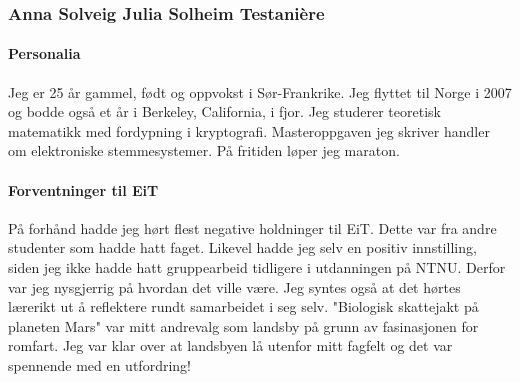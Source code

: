 \subsubsection{Anna Solveig Julia Solheim Testani\`{e}re}

\paragraph{Personalia}
Jeg er 25 år gammel, født og oppvokst i Sør-Frankrike. Jeg flyttet til Norge i 2007 og bodde også et år i Berkeley, California, i fjor.
Jeg studerer teoretisk matematikk med fordypning i kryptografi. Masteroppgaven jeg skriver handler om elektroniske stemmesystemer. På fritiden løper jeg maraton.

\paragraph{Forventninger til EiT}
På forhånd hadde jeg hørt flest negative holdninger til EiT.
Dette var fra andre studenter som hadde hatt faget.
Likevel hadde jeg selv en positiv innstilling, siden jeg ikke hadde hatt gruppearbeid tidligere i utdanningen på NTNU.
Derfor var jeg nysgjerrig på hvordan det ville være.
Jeg syntes også at det hørtes lærerikt ut å reflektere rundt samarbeidet i seg selv.
"Biologisk skattejakt på planeten Mars" var mitt andrevalg som landsby på grunn av fasinasjonen for romfart.
Jeg var klar over at landsbyen lå utenfor mitt fagfelt og det var spennende med en utfordring!